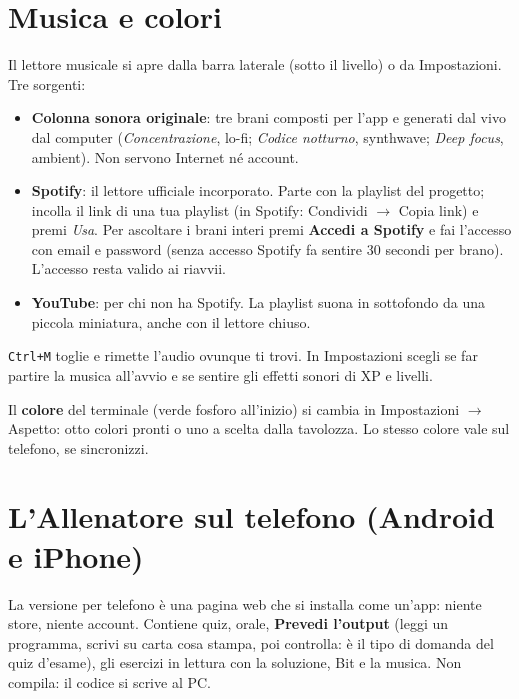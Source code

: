 \section*{Musica e colori}

Il lettore musicale si apre dalla barra laterale (sotto il livello) o da Impostazioni.
Tre sorgenti:
\begin{itemize}
  \item \textbf{Colonna sonora originale}: tre brani composti per l'app e generati dal
        vivo dal computer (\emph{Concentrazione}, lo-fi; \emph{Codice notturno},
        synthwave; \emph{Deep focus}, ambient). Non servono Internet né account.
  \item \textbf{Spotify}: il lettore ufficiale incorporato. Parte con la playlist del
        progetto; incolla il link di una tua playlist (in Spotify: Condividi $\to$ Copia
        link) e premi \emph{Usa}. Per ascoltare i brani interi premi \textbf{Accedi a
        Spotify} e fai l'accesso con email e password (senza accesso Spotify fa sentire
        30 secondi per brano). L'accesso resta valido ai riavvii.
  \item \textbf{YouTube}: per chi non ha Spotify. La playlist suona in sottofondo da una
        piccola miniatura, anche con il lettore chiuso.
\end{itemize}
\texttt{Ctrl+M} toglie e rimette l'audio ovunque ti trovi. In Impostazioni scegli se far
partire la musica all'avvio e se sentire gli effetti sonori di XP e livelli.

Il \textbf{colore} del terminale (verde fosforo all'inizio) si cambia in Impostazioni
$\to$ Aspetto: otto colori pronti o uno a scelta dalla tavolozza. Lo stesso colore vale
sul telefono, se sincronizzi.

\section*{L'Allenatore sul telefono (Android e iPhone)}

La versione per telefono è una pagina web che si installa come un'app: niente store,
niente account. Contiene quiz, orale, \textbf{Prevedi l'output} (leggi un programma,
scrivi su carta cosa stampa, poi controlla: è il tipo di domanda 
del quiz d'esame), gli esercizi in lettura con la soluzione, Bit e la musica. Non
compila: il codice si scrive al PC.

